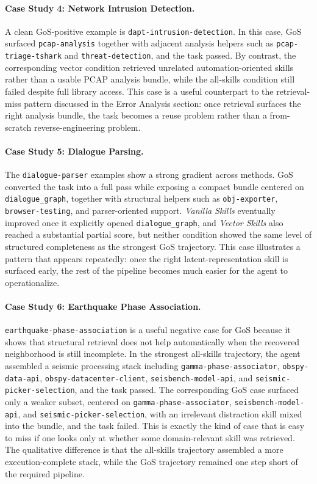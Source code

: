 \paragraph{Case Study 4: Network Intrusion Detection.} A clean GoS-positive example is \texttt{dapt-intrusion-detection}. In this case, GoS surfaced \texttt{pcap-analysis} together with adjacent analysis helpers such as \texttt{pcap-triage-tshark} and \texttt{threat-detection}, and the task passed. By contrast, the corresponding vector condition retrieved unrelated automation-oriented skills rather than a usable PCAP analysis bundle, while the all-skills condition still failed despite full library access. This case is a useful counterpart to the retrieval-miss pattern discussed in the Error Analysis section: once retrieval surfaces the right analysis bundle, the task becomes a reuse problem rather than a from-scratch reverse-engineering problem.

\paragraph{Case Study 5: Dialogue Parsing.} The \texttt{dialogue-parser} examples show a strong gradient across methods. GoS converted the task into a full pass while exposing a compact bundle centered on \texttt{dialogue\_graph}, together with structural helpers such as \texttt{obj-exporter}, \texttt{browser-testing}, and parser-oriented support. \textit{Vanilla Skills} eventually improved once it explicitly opened \texttt{dialogue\_graph}, and \textit{Vector Skills} also reached a substantial partial score, but neither condition showed the same level of structured completeness as the strongest GoS trajectory. This case illustrates a pattern that appears repeatedly: once the right latent-representation skill is surfaced early, the rest of the pipeline becomes much easier for the agent to operationalize.

\paragraph{Case Study 6: Earthquake Phase Association.} \texttt{earthquake-phase-association} is a useful negative case for GoS because it shows that structural retrieval does not help automatically when the recovered neighborhood is still incomplete. In the strongest all-skills trajectory, the agent assembled a seismic processing stack including \texttt{gamma-phase-associator}, \texttt{obspy-data-api}, \texttt{obspy-datacenter-client}, \texttt{seisbench-model-api}, and \texttt{seismic-picker-selection}, and the task passed. The corresponding GoS case surfaced only a weaker subset, centered on \texttt{gamma-phase-associator}, \texttt{seisbench-model-api}, and \texttt{seismic-picker-selection}, with an irrelevant distraction skill mixed into the bundle, and the task failed. This is exactly the kind of case that is easy to miss if one looks only at whether some domain-relevant skill was retrieved. The qualitative difference is that the all-skills trajectory assembled a more execution-complete stack, while the GoS trajectory remained one step short of the required pipeline.

